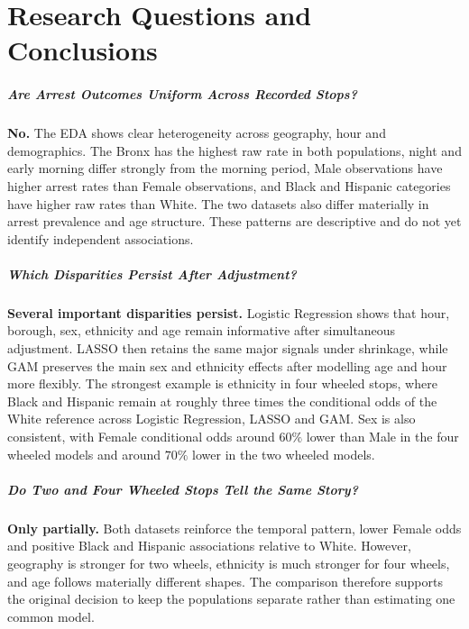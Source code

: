 \chapter{Research Questions and Conclusions}

\paragraph{Are Arrest Outcomes Uniform Across Recorded Stops?}

\textbf{No.} The EDA shows clear heterogeneity across geography, hour and demographics. The Bronx has the highest raw rate in both populations, night and early morning differ strongly from the morning period, Male observations have higher arrest rates than Female observations, and Black and Hispanic categories have higher raw rates than White. The two datasets also differ materially in arrest prevalence and age structure. These patterns are descriptive and do not yet identify independent associations.

\paragraph{Which Disparities Persist After Adjustment?}

\textbf{Several important disparities persist.} Logistic Regression shows that hour, borough, sex, ethnicity and age remain informative after simultaneous adjustment. LASSO then retains the same major signals under shrinkage, while GAM preserves the main sex and ethnicity effects after modelling age and hour more flexibly. The strongest example is ethnicity in four wheeled stops, where Black and Hispanic remain at roughly three times the conditional odds of the White reference across Logistic Regression, LASSO and GAM. Sex is also consistent, with Female conditional odds around $60\%$ lower than Male in the four wheeled models and around $70\%$ lower in the two wheeled models.

\paragraph{Do Two and Four Wheeled Stops Tell the Same Story?}

\textbf{Only partially.} Both datasets reinforce the temporal pattern, lower Female odds and positive Black and Hispanic associations relative to White. However, geography is stronger for two wheels, ethnicity is much stronger for four wheels, and age follows materially different shapes. The comparison therefore supports the original decision to keep the populations separate rather than estimating one common model.

